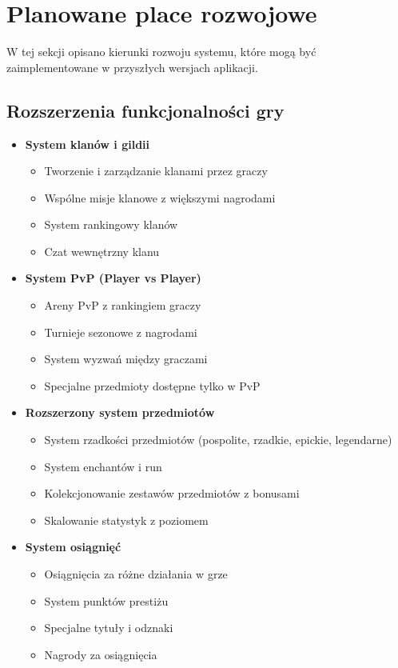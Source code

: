 \chapter{Planowane place rozwojowe}

W tej sekcji opisano kierunki rozwoju systemu, które mogą być zaimplementowane w przyszłych wersjach aplikacji.

\section{Rozszerzenia funkcjonalności gry}

\begin{itemize}
    \item \textbf{System klanów i gildii}
    \begin{itemize}
        \item Tworzenie i zarządzanie klanami przez graczy
        \item Wspólne misje klanowe z większymi nagrodami
        \item System rankingowy klanów
        \item Czat wewnętrzny klanu
    \end{itemize}

    \item \textbf{System PvP (Player vs Player)}
    \begin{itemize}
        \item Areny PvP z rankingiem graczy
        \item Turnieje sezonowe z nagrodami
        \item System wyzwań między graczami
        \item Specjalne przedmioty dostępne tylko w PvP
    \end{itemize}

    \item \textbf{Rozszerzony system przedmiotów}
    \begin{itemize}
        \item System rzadkości przedmiotów (pospolite, rzadkie, epickie, legendarne)
        \item System enchantów i run
        \item Kolekcjonowanie zestawów przedmiotów z bonusami
        \item Skalowanie statystyk z poziomem
    \end{itemize}

    \item \textbf{System osiągnięć}
    \begin{itemize}
        \item Osiągnięcia za różne działania w grze
        \item System punktów prestiżu
        \item Specjalne tytuły i odznaki
        \item Nagrody za osiągnięcia
    \end{itemize}


\end{itemize}
